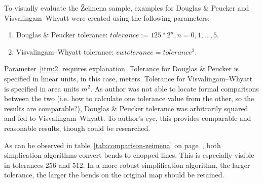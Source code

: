 \documentclass[a4paper]{article}
\newcommand{\DP}{Douglas \& Peucker}
\newcommand{\VW}{Visvalingam--Whyatt}
\begin{document}
To visually evaluate the Žeimena sample, examples for {\DP} and {\VW}
were created using the following parameters:

\begin{enumerate}[label=(\Roman*)]
    \item {\DP} tolerance: $tolerance := 125 * 2^n, n = 0,1,...,5$.
    \item {\VW} tolerance: $vwtolerance = tolerance ^ 2$\label{itm:2}.
\end{enumerate}

Parameter~\ref{itm:2} requires explanation. Tolerance for {\DP} is specified in
linear units, in this case, meters. Tolerance for {\VW} is specified in area
units $m^2$. As author was not able to locate formal comparisons between the
two (i.e. how to calculate one tolerance value from the other, so the results
are comparable?), {\DP} tolerance was arbitrarily squared and fed to {\VW}. To
author's eye, this provides comparable and reasonable results, though could be
researched.

As can be observed in table~\ref{tab:comparison-zeimena} on
page~\pageref{tab:comparison-zeimena}, both simplication algorithms convert
bends to chopped lines. This is especially visible in tolerances 256 and 512.
In a more robust simplification algorithm, the larger tolerance, the larger the
bends on the original map should be retained.
\end{document}
